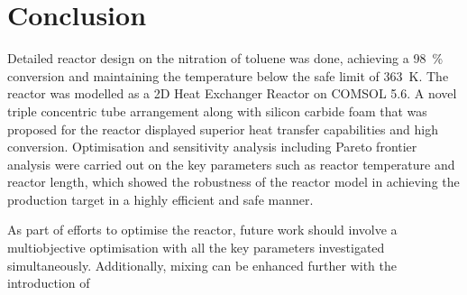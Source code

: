 \section{Conclusion} \label{sec:conclusion}
Detailed reactor design on the nitration of toluene was done, achieving a \SI{98}{\%} conversion and maintaining the temperature below the safe limit of \SI{363}{\K}. The reactor was modelled as a 2D Heat Exchanger Reactor on COMSOL 5.6. A novel triple concentric tube arrangement along with silicon carbide foam that was proposed for the reactor displayed superior heat transfer capabilities and high conversion. Optimisation and sensitivity analysis including Pareto frontier analysis were carried out on the key parameters such as reactor temperature and reactor length, which showed the robustness of the reactor model in achieving the production target in a highly efficient and safe manner.  

As part of efforts to optimise the reactor, future work should involve a multiobjective optimisation with all the key parameters investigated simultaneously. Additionally, mixing can be enhanced further with the introduction of 


